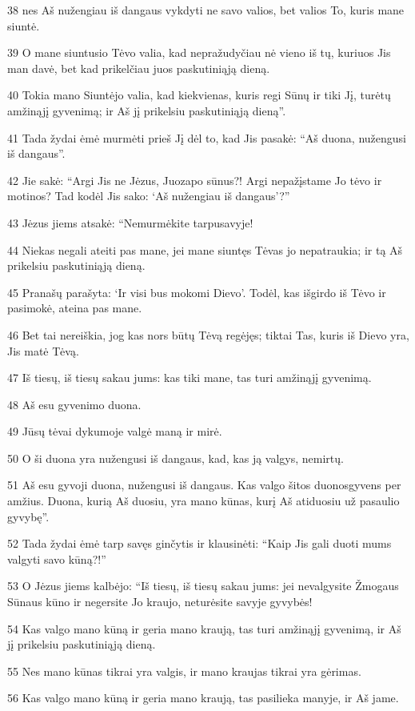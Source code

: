 \par 38 nes Aš nužengiau iš dangaus vykdyti ne savo valios, bet valios To, kuris mane siuntė. 
\par 39 O mane siuntusio Tėvo valia,­ kad nepražudyčiau nė vieno iš tų, kuriuos Jis man davė, bet kad prikelčiau juos paskutiniąją dieną. 
\par 40 Tokia mano Siuntėjo valia, kad kiekvienas, kuris regi Sūnų ir tiki Jį, turėtų amžinąjį gyvenimą; ir Aš jį prikelsiu paskutiniąją dieną”. 
\par 41 Tada žydai ėmė murmėti prieš Jį dėl to, kad Jis pasakė: “Aš duona, nužengusi iš dangaus”. 
\par 42 Jie sakė: “Argi Jis ne Jėzus, Juozapo sūnus?! Argi nepažįstame Jo tėvo ir motinos? Tad kodėl Jis sako: ‘Aš nužengiau iš dangaus’?” 
\par 43 Jėzus jiems atsakė: “Nemurmėkite tarpusavyje! 
\par 44 Niekas negali ateiti pas mane, jei mane siuntęs Tėvas jo nepatraukia; ir tą Aš prikelsiu paskutiniąją dieną. 
\par 45 Pranašų parašyta: ‘Ir visi bus mokomi Dievo’. Todėl, kas išgirdo iš Tėvo ir pasimokė, ateina pas mane. 
\par 46 Bet tai nereiškia, jog kas nors būtų Tėvą regėjęs; tiktai Tas, kuris iš Dievo yra, Jis matė Tėvą. 
\par 47 Iš tiesų, iš tiesų sakau jums: kas tiki mane, tas turi amžinąjį gyvenimą. 
\par 48 Aš esu gyvenimo duona. 
\par 49 Jūsų tėvai dykumoje valgė maną ir mirė. 
\par 50 O ši duona yra nužengusi iš dangaus, kad, kas ją valgys, nemirtų. 
\par 51 Aš esu gyvoji duona, nužengusi iš dangaus. Kas valgo šitos duonos­gyvens per amžius. Duona, kurią Aš duosiu, yra mano kūnas, kurį Aš atiduosiu už pasaulio gyvybę”. 
\par 52 Tada žydai ėmė tarp savęs ginčytis ir klausinėti: “Kaip Jis gali duoti mums valgyti savo kūną?!” 
\par 53 O Jėzus jiems kalbėjo: “Iš tiesų, iš tiesų sakau jums: jei nevalgysite Žmogaus Sūnaus kūno ir negersite Jo kraujo, neturėsite savyje gyvybės! 
\par 54 Kas valgo mano kūną ir geria mano kraują, tas turi amžinąjį gyvenimą, ir Aš jį prikelsiu paskutiniąją dieną. 
\par 55 Nes mano kūnas tikrai yra valgis, ir mano kraujas tikrai yra gėrimas. 
\par 56 Kas valgo mano kūną ir geria mano kraują, tas pasilieka manyje, ir Aš jame. 
